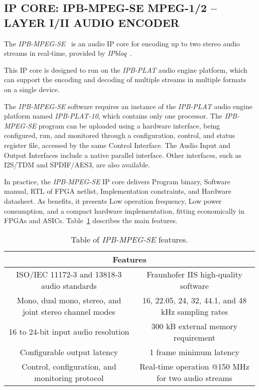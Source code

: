 \subsection{IP CORE: IPB-MPEG-SE MPEG-1/2 – LAYER I/II AUDIO ENCODER}

The \textit{IPB-MPEG-SE}~\cite{ipb-mpeg-se} is an audio IP core for encoding up to two stereo audio streams in real-time, provided by \textit{IPbloq}~\cite{ipbloq}.

This IP core is designed to run on the \textit{IPB-PLAT} audio engine platform, which can support the encoding and decoding of multiple streams in multiple formats on a single device.

The \textit{IPB-MPEG-SE} software requires an instance of the \textit{IPB-PLAT} audio engine platform named \textit{IPB-PLAT-10}, which contains only one processor. 
The \textit{IPB-MPEG-SE} program can be uploaded using a hardware interface, being configured, run, and monitored through a configuration, control, and status register file, accessed by the same Control Interface.
The Audio Input and Output Interfaces include a native parallel interface. Other interfaces, such as I2S/TDM and SPDIF/AES3, are also available.

In practice, the \textit{IPB-MPEG-SE} IP core delivers Program binary, Software manual, RTL of FPGA netlist, Implementation constraints, and Hardware datasheet.
As benefits, it presents Low operation frequency, Low power consumption, and a compact hardware implementation, fitting economically in FPGAs and ASICs.
Table~\ref{tab:ipbloq} describes the main features.

\begin{table}[h]
    \centering
    \begin{tabular}{|c|c|}
        \hline
        \multicolumn{2}{|c|}{\textbf{Features}} \\
        \hline
         ISO/IEC 11172-3 and 13818-3 audio standards & Fraunhofer IIS high-quality software \\
         \hline
         Mono, dual mono, stereo, and joint stereo channel modes & 16, 22.05, 24, 32, 44.1, and 48 kHz sampling rates \\
         \hline
         16 to 24-bit input audio resolution & 300 kB external memory requirement\\
         \hline
         Configurable output latency & 1 frame minimum latency\\
         \hline
         Control, configuration, and monitoring protocol & Real-time operation @150 MHz for two audio streams\\
         \hline
    \end{tabular}
    \caption{Table of \textit{IPB-MPEG-SE} features.}
    \label{tab:ipbloq}
\end{table}

